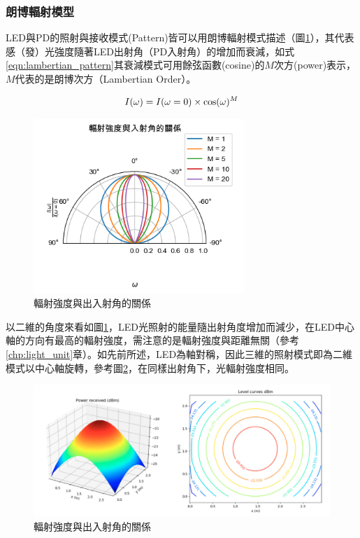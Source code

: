         
        \subsubsection{朗博輻射模型}
        \label{chp:lambertian}

        

        LED與PD的照射與接收模式(Pattern)皆可以用朗博輻射模式描述（圖\ref{pic:lambertian}），其代表感（發）光強度隨著LED出射角（PD入射角）的增加而衰減，如式\ref{eqn:lambertian_pattern}其衰減模式可用餘弦函數(cosine)的$M$次方(power)表示，$M$代表的是朗博次方（Lambertian Order）。

        \begin{equation}
            \label{eqn:lambertian_pattern}
            I(\omega)=I(\omega=0)\times\cos(\omega)^{M}\\
        \end{equation}

        \begin{figure}[ht]
            \centering
            \includegraphics[width=8cm]{ch2pic/lambertian.png}
            \caption{輻射強度與出入射角的關係}
            \label{pic:lambertian}
        \end{figure}

        以二維的角度來看如圖\ref{pic:lambertian}，LED光照射的能量隨出射角度增加而減少，在LED中心軸的方向有最高的輻射強度，需注意的是輻射強度與距離無關（參考\ref{chp:light_unit}章）。如先前所述，LED為軸對稱，因此三維的照射模式即為二維模式以中心軸旋轉，參考圖\ref{pic:lambertian_3d}，在同樣出射角下，光輻射強度相同。
        
        \begin{figure}[ht]
            \centering
            \includegraphics[width=12cm]{ch2pic/lambertian_3d.png}
            \caption{輻射強度與出入射角的關係}
            \label{pic:lambertian_3d}
        \end{figure}

